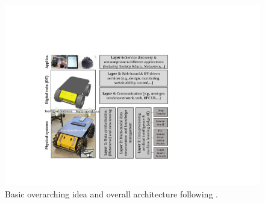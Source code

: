 \documentclass[conference]{IEEEtran}
\begin{document}
\begin{figure}[htbp]
    \centerline{\includegraphics[width=0.98\columnwidth]{Pictures/layer0.pdf}}
    \caption{Basic overarching idea and overall architecture following \cite{kaigom,kaigom2020value}.}
    \label{fig:3dreal}
\end{figure}
\end{document}
